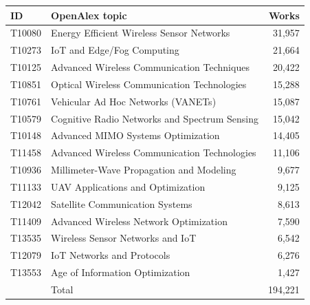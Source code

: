 \begin{tabular}{llr}
\toprule
ID & OpenAlex topic & Works\\
\midrule
T10080 & Energy Efficient Wireless Sensor Networks & 31,957\\
T10273 & IoT and Edge/Fog Computing & 21,664\\
T10125 & Advanced Wireless Communication Techniques & 20,422\\
T10851 & Optical Wireless Communication Technologies & 15,288\\
T10761 & Vehicular Ad Hoc Networks (VANETs) & 15,087\\
T10579 & Cognitive Radio Networks and Spectrum Sensing & 15,042\\
T10148 & Advanced MIMO Systems Optimization & 14,405\\
T11458 & Advanced Wireless Communication Technologies & 11,106\\
T10936 & Millimeter-Wave Propagation and Modeling & 9,677\\
T11133 & UAV Applications and Optimization & 9,125\\
T12042 & Satellite Communication Systems & 8,613\\
T11409 & Advanced Wireless Network Optimization & 7,590\\
T13535 & Wireless Sensor Networks and IoT & 6,542\\
T12079 & IoT Networks and Protocols & 6,276\\
T13553 & Age of Information Optimization & 1,427\\
\midrule
 & Total & 194,221\\
\bottomrule
\end{tabular}